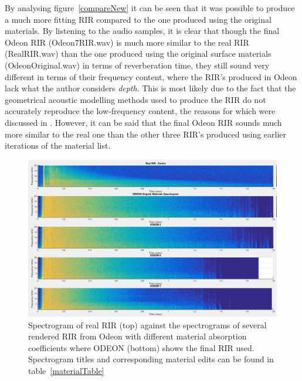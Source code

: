 \documentclass[../../main.tex]{subfiles}
\begin{document}
			By analysing figure~\ref{compareNew} it can be seen that it was possible to produce a much more fitting \ac{RIR} compared to the one produced using the original materials. By listening to the audio samples, it is clear that though the final Odeon RIR (Odeon7RIR.wav) is much more similar to the real \ac{RIR} (RealRIR.wav) than the one produced using the original surface materials (OdeonOriginal.wav) in terms of reverberation time, they still sound very different in terms of their frequency content, where the \ac{RIR}'s produced in Odeon lack what the author considers \textit{depth}. This is most likely due to the fact that the geometrical acoustic modelling methods used to produce the \ac{RIR} do not accurately reproduce the low-frequency content, the reasons for which were discussed in . However, it can be said that the final Odeon \ac{RIR} sounds much more similar to the real one than the other three \ac{RIR}'s produced using earlier iterations of the material list.

			\begin{figure}[H]
				\centerline{\includegraphics[scale = 0.45]{Sections/Implementation/Odeon/images/MaterialCompare/OriginalMaterials/all.png}}
				\caption{Spectrogram of real \ac{RIR} (top) against the spectrograms of several rendered \ac{RIR} from Odeon with different material absorption coefficients where ODEON (bottom) shows the final \ac{RIR} used. Spectrogram titles and corresponding material edits can be found in table~\ref{materialTable}}
				\label{compareAll}
			\end{figure}
\end{document}
